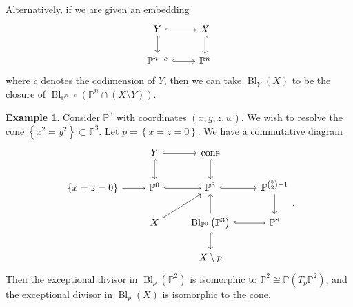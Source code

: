 \documentclass[10pt,letterpaper,cm]{nupset}
\theoremstyle{definition}
\newtheorem{exmp}[defn]{Example}
\theoremstyle{theorem}
\theoremstyle{remark}
\renewcommand{\P}{\mathbb P}
\newcommand{\1}{\mathbb{1}}
\newcommand{\0}{\vec 0}
\DeclareMathOperator{\bl}{\mathrm{Bl}}
\begin{document}
\smallskip

Alternatively, if we are given an embedding 
\[
\begin{tikzcd}
Y \arrow[d, hook] \arrow[r, hook] & X \arrow[d, hook] \\
\P^{n-c} \arrow[r, hook]          & \P^n             
\end{tikzcd}
\] where $c$ denotes the codimension of $Y$, then we can take $\bl_Y(X)$ to be the closure of $\bl_{\P^{n-c}}\left(\P^n \cap \left(X \setminus Y\right)\right)$.

\begin{exmp}
Consider $\P^3$ with coordinates $\left(x,y,z,w\right)$. We wish to resolve the cone $\left\{x^2 = y^2\right\} \subset \P^3$. Let $p = \left\{x=z=0\right\}$.
We have a commutative diagram
\[
\begin{tikzcd}
                    & Y \arrow[d, hook] \arrow[r, hook] & \text{cone} \arrow[d, hook]                                           &                               \\
\{x=z=0\} \arrow[r] & \P^0 \arrow[r, hook]              & \P^3 \arrow[r, hook]                                                  & \P^{{5\choose 2}-1} \arrow[d] \\
                    & X \arrow[ru, hook]                & \bl_{\P^0}\left(\P^3\right) \arrow[r, hook] \arrow[d, hook] \arrow[u] & \P^8                          \\
                    &                                   & X\setminus p                                                          &                              
\end{tikzcd}
.\] Then the exceptional divisor in $\bl_p\left(\P^2\right)$ is isomorphic to $\P^2 \cong \P\left(T_p{\P^2}\right)$, and the exceptional divisor in $\bl_p(X)$ is isomorphic to the cone.
\end{exmp}
\end{document}

